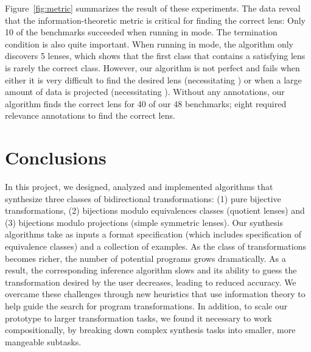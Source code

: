 \documentclass[12pt]{article}
\begin{document}
{Figure~\ref{fig:metric} summarizes the result of these experiments. The data
reveal that the information-theoretic metric is critical for finding the correct
lens: Only 10 of the benchmarks succeeded when running in \CCOpt{} mode. The
termination condition is also quite important. When running in \FLOpt{} mode,
the algorithm only discovers 5 lenses, which shows that the first class that
contains a satisfying lens is rarely the correct class. However, our algorithm
is not perfect and fails when either it is very difficult to find the desired
lens (necessitating \SRequire) or when a large amount of data is projected
(necessitating \Skip). Without any annotations, our algorithm finds the correct
lens for 40 of our 48 benchmarks; eight required relevance annotations to find
the correct lens.

\section{Conclusions}

In this project, we designed, analyzed and implemented algorithms that
synthesize three classes of bidirectional transformations: (1) pure
bijective transformations, (2) bijections modulo equivalences classes
(quotient lenses) and (3) bijections modulo projections (simple symmetric
lenses).  Our synthesis algorithms take as inputs a format specification
(which includes specification of equivalence classes) and a collection of
examples.  As the class of transformations becomes richer, the number of
potential programs grows dramatically.  As a result, the corresponding
inference algorithm slows and its ability to guess the transformation
desired by the user decreases, leading to reduced accuracy.  We overcame
these challenges through new heuristics that use information theory to help
guide the search for program transformations.  In addition, to scale our
prototype to larger transformation tasks, we found it necessary to work
compositionally, by breaking down complex synthesis tasks into smaller, more
mangeable subtasks.




}
\end{document}
